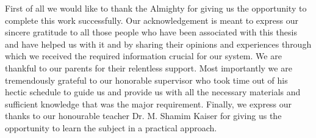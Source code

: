 
First of all we would like to thank the Almighty for giving us the opportunity to complete this work successfully. Our acknowledgement is meant to express our sincere gratitude to all those people who have been associated with this thesis and have helped us with it and by sharing their opinions and experiences through which we received the required information crucial for our system. We are thankful to our parents for their relentless support. Most importantly we are tremendously grateful to our honorable supervisor who took time out of his hectic schedule to guide us and provide us with all the necessary materials and sufficient knowledge that was the major requirement. Finally, we express our thanks to our honourable teacher Dr. M. Shamim Kaiser for giving us the opportunity to learn the subject in a practical approach.
